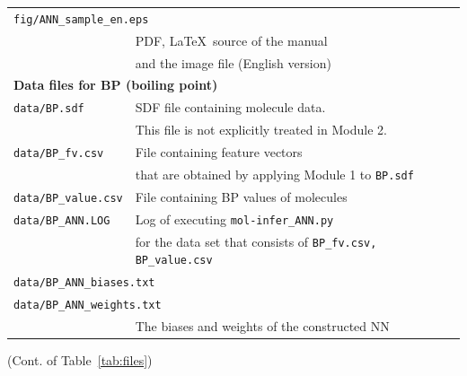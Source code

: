 \documentclass[11pt,titlepage,dvipdfmx,twoside]{book}
\newcommand{\tabref}[1]{Table~\ref{tab:#1}}
\begin{document}
{\begin{table}[h!]
\begin{tabular}{lcll}
  \multicolumn{4}{l}{\tt fig/ANN\_sample\_en.eps}\\
  &&\multicolumn{2}{l}{PDF, \LaTeX\   source of the manual}\\
  &&\multicolumn{2}{l}{and the image file (English version)}\\
  \hline
  \multicolumn{4}{l}{\bf Data files for BP (boiling point)~\cite{pubchem}}\\
  \multicolumn{2}{l}{\tt data/BP.sdf} & \multicolumn{2}{l}{SDF file containing molecule data.}\\
  \multicolumn{2}{l}{\tt } & \multicolumn{2}{l}{This file is not explicitly treated in Module 2.}\\
  \multicolumn{2}{l}{\tt data/BP\_fv.csv} & \multicolumn{2}{l}{File containing feature vectors}\\
  \multicolumn{2}{l}{\tt } & \multicolumn{2}{l}{that are obtained by applying Module 1 to {\tt BP.sdf}}\\
  \multicolumn{2}{l}{\tt data/BP\_value.csv} & \multicolumn{2}{l}{File containing BP values of molecules}\\
  \multicolumn{2}{l}{\tt data/BP\_ANN.LOG} & \multicolumn{2}{l}{Log of executing {\tt mol-infer\_ANN.py}}\\
  \multicolumn{2}{l}{\tt } & \multicolumn{2}{l}{for the data set that consists of {\tt BP\_fv.csv, BP\_value.csv}}\\
  \multicolumn{4}{l}{\tt data/BP\_ANN\_biases.txt} \\
  \multicolumn{4}{l}{\tt data/BP\_ANN\_weights.txt} \\
  &&\multicolumn{2}{l}{The biases and weights of the constructed NN}\\
  \hline
  \end{tabular}
\end{table}

\newpage

\begin{table}[t!]
  \centering
  (Cont. of \tabref{files})
  

\end{table}}
\end{document}
